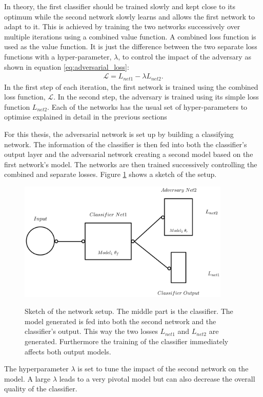  In theory, the first classifier should be trained slowly and kept close to its optimum while the second network slowly learns and allows the first network to adapt to it. This is achieved by training the two networks successively over multiple iterations using a combined value function.
A combined loss function is used as the value function. It is just the difference between the two separate loss functions with a hyper-parameter, $\lambda$, to control the impact of the adversary as shown in equation \eqref{eq:adversarial_loss}:
%
\begin{align}
    \mathcal{L} = L_{net1} - \lambda L_{net2}.
    \label{eq:adversarial_loss}
\end{align}
%
In the first step of each iteration, the first network is trained using the combined loss function, $\mathcal{L}$. In the second step, the adversary is trained using its simple loss function $L_{net2}$. Each of the networks has the usual set of hyper-parameters to optimise explained in detail in the previous sections

For this thesis, the adversarial network is set up by building a classifying network. The information of the classifier is then fed into both the classifier's output layer and the adversarial network creating a second model based on the first network's model. The networks are then trained successively controlling the combined and separate losses. Figure \ref{fig:ANN_sketch} shows a sketch of the setup.
%
\begin{figure}[htbp]
	\centering
	\includegraphics[width=0.9\textwidth]{figures_ML/ANN_sketch.png}
	\label{fig:ANN_sketch}
	\caption[Adversarial setup sketched]{Sketch of the network setup. The middle part is the classifier. The model generated is fed into both the second network and the classifier's output. This way the two losses $L_{net1}$ and $L_{net2}$ are generated. Furthermore the training of the classifier immediately affects both output models.}
\end{figure}
%
The hyperparameter $\lambda$ is set to tune the impact of the second network on the model. A large $\lambda$ leads to a very pivotal model but can also decrease the overall quality of the classifier.

